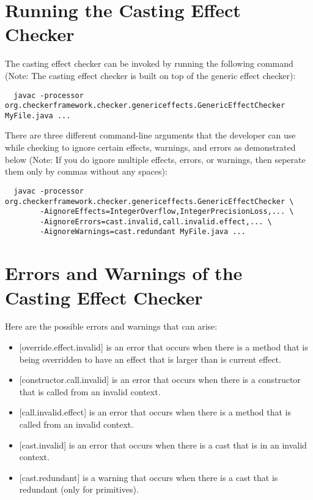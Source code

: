 \section{Running the Casting Effect Checker\label{castingeffect-running}}

The casting effect checker can be invoked by running the following command (Note: The casting effect checker is built on top of the generic effect checker):
\begin{Verbatim}
  javac -processor org.checkerframework.checker.genericeffects.GenericEffectChecker MyFile.java ...
\end{Verbatim}

There are three different command-line arguments that the developer can use while checking to ignore certain effects, warnings, and errors as demonstrated below (Note: If you do ignore multiple effects, errors, or warnings, then seperate them only by commas without any spaces):
\begin{Verbatim}
  javac -processor org.checkerframework.checker.genericeffects.GenericEffectChecker \
        -AignoreEffects=IntegerOverflow,IntegerPrecisionLoss,... \
        -AignoreErrors=cast.invalid,call.invalid.effect,... \
        -AignoreWarnings=cast.redundant MyFile.java ...
\end{Verbatim}

\section{Errors and Warnings of the Casting Effect Checker\label{castingeffect-errors}}

Here are the possible errors and warnings that can arise:
\begin{itemize}
\item
{[override.effect.invalid]} is an error that occurs when there is a method that is being overridden to have an effect that is larger than is current effect.
\item
{[constructor.call.invalid]} is an error that occurs when there is a constructor that is called from an invalid context.
\item
{[call.invalid.effect]} is an error that occurs when there is a method that is called from an invalid context.
\item
{[cast.invalid]} is an error that occurs when there is a cast that is in an invalid context.
\item
{[cast.redundant]} is a warning that occurs when there is a cast that is redundant (only for primitives).
\end{itemize}